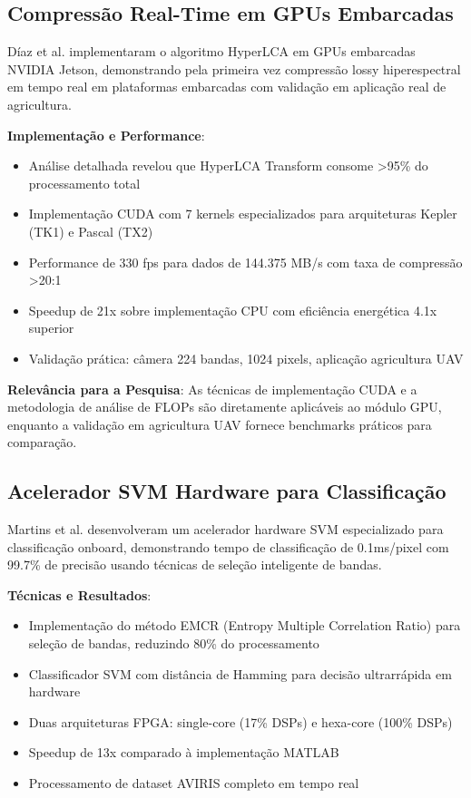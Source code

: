 \subsection{Compressão Real-Time em GPUs Embarcadas}

Díaz et al. \cite{diaz2019} implementaram o algoritmo HyperLCA em GPUs embarcadas NVIDIA Jetson, demonstrando pela primeira vez compressão lossy hiperespectral em tempo real em plataformas embarcadas com validação em aplicação real de agricultura.

\textbf{Implementação e Performance}:
\begin{itemize}
\item Análise detalhada revelou que HyperLCA Transform consome >95\% do processamento total
\item Implementação CUDA com 7 kernels especializados para arquiteturas Kepler (TK1) e Pascal (TX2)
\item Performance de 330 fps para dados de 144.375 MB/s com taxa de compressão >20:1
\item Speedup de 21x sobre implementação CPU com eficiência energética 4.1x superior
\item Validação prática: câmera 224 bandas, 1024 pixels, aplicação agricultura UAV
\end{itemize}

\textbf{Relevância para a Pesquisa}: As técnicas de implementação CUDA e a metodologia de análise de FLOPs são diretamente aplicáveis ao módulo GPU, enquanto a validação em agricultura UAV fornece benchmarks práticos para comparação.

\subsection{Acelerador SVM Hardware para Classificação}

Martins et al. \cite{martins2019} desenvolveram um acelerador hardware SVM especializado para classificação onboard, demonstrando tempo de classificação de 0.1ms/pixel com 99.7\% de precisão usando técnicas de seleção inteligente de bandas.

\textbf{Técnicas e Resultados}:
\begin{itemize}
\item Implementação do método EMCR (Entropy Multiple Correlation Ratio) para seleção de bandas, reduzindo 80\% do processamento
\item Classificador SVM com distância de Hamming para decisão ultrarrápida em hardware
\item Duas arquiteturas FPGA: single-core (17\% DSPs) e hexa-core (100\% DSPs)
\item Speedup de 13x comparado à implementação MATLAB
\item Processamento de dataset AVIRIS completo em tempo real
\end{itemize}

